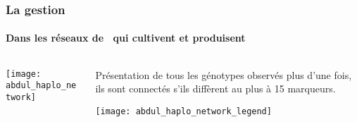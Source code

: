 \begin{frame}
\frametitle{La gestion \insitu}
\framesubtitle{Dans les réseaux de \MSPs~qui cultivent et produisent}

\begin{columns}

\begin{column}{.75\textwidth}
\begin{center}
\texttt{[image: abdul\_haplo\_network]}
\end{center}
\end{column}

\begin{column}{.25\textwidth}
Présentation de tous les génotypes observés plus d’une fois, ils sont connectés s’ils diffèrent au plus à 15 marqueurs. 
\begin{center}
\texttt{[image: abdul\_haplo\_network\_legend]}
\end{center}
\end{column}

\end{columns}

\end{frame}



